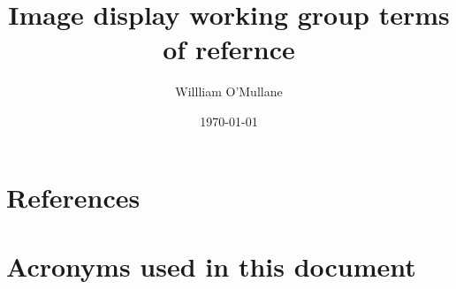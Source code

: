 \documentclass[DM,lsstdraft,toc]{lsstdoc}
\title{	Image display working group terms of refernce}
\author{%
Willliam O'Mullane
}
\date{\today}
\begin{document}
\maketitle





\appendix
\section{References} \label{sec:bib}


\section{Acronyms used in this document}\label{sec:acronyms}

\printglossaries
\end{document}
